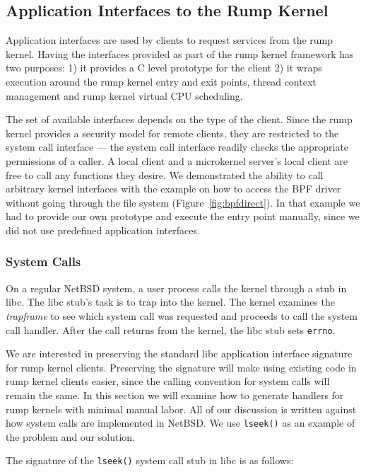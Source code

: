 \subsection{Application Interfaces to the Rump Kernel}

Application interfaces are used by clients to request services from
the rump kernel.  Having the interfaces provided as part of the
rump kernel framework has two purposes: 1) it provides a C level
prototype for the client 2) it wraps execution around the rump kernel
entry and exit points, \ie thread context management and rump kernel
virtual CPU scheduling.

The set of available interfaces depends on the type of the client.
Since the rump kernel provides a security model for remote clients,
they are restricted to the system call interface --- the system
call interface readily checks the appropriate permissions of a
caller.  A local client and a microkernel server's local client 
are free to call any functions they desire.  We demonstrated the
ability to call arbitrary kernel interfaces
with the example on how to access the BPF driver without going
through the file system (Figure~\ref{fig:bpfdirect}).  In that
example we had to provide our own prototype and execute the entry
point manually, since we did not use predefined application
interfaces.

\subsubsection{System Calls}
\label{sect:syscallentry}

On a regular NetBSD system, a user process calls the kernel through
a stub in libc.  The libc stub's task is to trap into the kernel.
The kernel examines the \textit{trapframe} to see which system call
was requested and proceeds to call the system call handler.  After
the call returns from the kernel, the libc stub sets \texttt{errno}.

We are interested in preserving the standard libc application interface
signature for rump kernel clients.  Preserving the signature will make
using existing code in rump kernel clients easier, since the calling
convention for system calls will remain the same.  In this section we
will examine how to generate handlers for rump kernels with minimal
manual labor.  All of our discussion is written against how system calls
are implemented in NetBSD.  We use \texttt{lseek()} as an example
of the problem and our solution.

The signature of the \verb+lseek()+ system call stub in libc is as
follows:


